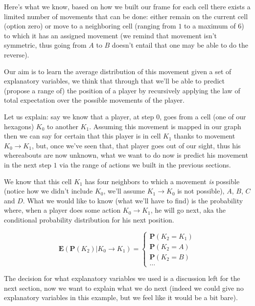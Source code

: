 \documentclass[9pt, a4paper]{IEEEtran}
\begin{document}
    Here's what we know, based on how we built our frame for each cell there exists a limited number of movements that can be done: either remain on the current cell (option zero) or move to a neighboring cell (ranging from $1$ to a maximum of $6$) to which it has an assigned movement (we remind that movement isn't symmetric, thus going from $A$ to $B$ doesn't entail that one may be able to do the reverse).
    
    Our aim is to learn the average distribution of this movement given a set of explanatory variables, we think that through that we'll be able to predict (propose a range of) the position of a player by recursively applying the law of total expectation over the possible movements of the player.

    Let us explain: say we know that a player, at step $0$, goes from a cell (one of our hexagons) $K_0$ to another $K_1$. Assuming this movement is mapped in our graph then we can say for certain that this player is in cell $K_1$ thanks to movement $K_0\to K_1$, but, once we've seen that, that player goes out of our sight, thus his whereabouts are now unknown, what we want to do now is predict his movement in the next step $1$ via the range of actions we built in the previous sections.
    
    We know that this cell $K_1$ has four neighbors to which a movement \emph{is} possible (notice how we didn't include $K_0$, we'll assume $K_1\to K_0$ is not possible), $A$, $B$, $C$ and $D$. What we would like to know (what we'll have to find) is the probability where, when a player does some action $K_0 \to K_1$, he will go next, aka the conditional probability distribution for his next position.
    
    \begin{equation*}
        \mathbf{E}\left( \mathbf{P}\left(K_2\right) | K_0 \to K_1\right) =
        \begin{cases}
            \mathbf{P}\left(K_2 = K_1\right)\\
            \mathbf{P}\left(K_2 = A\right)\\
            \mathbf{P}\left(K_2 = B\right)\\
            \dots
        \end{cases}
    \end{equation*}

    The decision for what explanatory variables we used is a discussion left for the next section, now we want to explain what we do next (indeed we could give no explanatory variables in this example, but we feel like it would be a bit bare).
\end{document}
